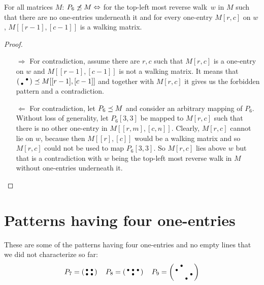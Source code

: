 \begin{prop}
For all matrices $M$: $P_6\not\preceq M\Leftrightarrow$ for the top-left most reverse walk~$w$ in $M$ such that there are no one-entries underneath it and for every one-entry $M[r,c]$ on $w$, $M[[r-1],[c-1]]$ is a walking matrix.
\end{prop}
\begin{proof}
\begin{itemize}
	\item[$\Rightarrow$] For contradiction, assume there are $r,c$ such that $M[r,c]$ is a one-entry on $w$ and $M[[r-1],[c-1]]$ is not a walking matrix. It means that $\left(\begin{smallmatrix} &\bullet\\\bullet& \end{smallmatrix}\right)\preceq M[[r-1],[c-1]]$ and together with $M[r,c]$ it gives us the forbidden pattern and a contradiction.
	\item[$\Leftarrow$] For contradiction, let $P_6\preceq M$ and consider an arbitrary mapping of $P_6$. Without loss of generality, let $P_6[3,3]$ be mapped to $M[r,c]$ such that there is no other one-entry in $M[[r,m],[c,n]]$. Clearly, $M[r,c]$ cannot lie on $w$, because then $M[[r],[c]]$ would be a walking matrix and so $M[r,c]$ could not be used to map $P_6[3,3]$. So $M[r,c]$ lies above $w$ but that is a contradiction with $w$ being the top-left most reverse walk in $M$ without one-entries underneath it.
\end{itemize}
\end{proof}

\section{Patterns having four one-entries}
\label{sec:4ones}
These are some of the patterns having four one-entries and no empty lines that we did not characterize so far:
$$P_7=\smm{\bullet&\bullet\\\bullet&\bullet}\ \ 
\ P_8=\smm{\bullet&\bullet&\bullet\\ &\bullet& }\ \ 
\ P_9=\smm{ &\bullet& & \\\bullet& & & \\ & & &\bullet\\ & &\bullet& }$$

